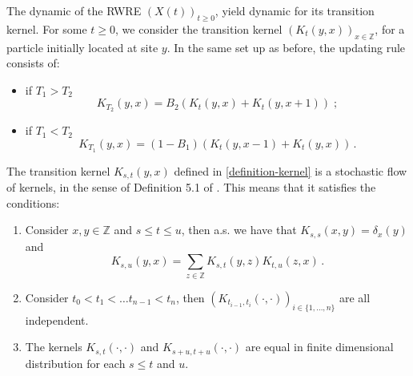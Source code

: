 \documentclass[a4paper,11pt,oneside,reqno]{amsart}
\theoremstyle{definition}
\renewcommand{\leq}{\leqslant}
\renewcommand{\geq}{\geqslant}
\numberwithin{equation}{section}
\begin{document}
The dynamic of the RWRE $(X(t))_{t\geq 0}$, yield dynamic for its transition kernel. For some $t\geq 0$, we consider the transition kernel $(K_{t}(y,x))_{x\in\mathbb{Z}}$, for a particle initially located at site $y$. In the same set up as before, the updating rule consists of:
\begin{itemize}
    \item if $T_{1}>T_{2}$
    \begin{equation}\label{updating-rule-kernel1}
        K_{T_{2}}(y,x)=B_{2}\left(K_{t}(y,x)+K_{t}(y,x+1)\right)\;;
    \end{equation}
    \item if $T_{1}<T_{2}$
    \begin{equation}\label{updating-rule-kernel2}
        K_{T_{1}}(y,x)=(1-B_{1})\left(K_{t}(y,x-1)+K_{t}(y,x)\right)\,.
    \end{equation}
\end{itemize}
The transition kernel $K_{s,t}(y,x)$ defined in \eqref{definition-kernel} is a stochastic flow of kernels, 
in the sense of Definition 5.1 of \cite{brownianWeb}. This means that it satisfies the conditions:
\begin{enumerate}
	\item Consider $x,y\in \mathbb{Z}$ and $s\leq t\leq u$, then a.s. we have that $K_{s,s}(x,y)=\delta_{x}(y)$ and 
	\begin{equation*}
		K_{s,u}(y,x)=\sum_{z\in\mathbb{Z}}K_{s,t}(y,z)K_{t,u}(z,x)\,.
	\end{equation*}
	\item Consider $t_{0}<t_{1}<\ldots t_{n-1}<t_{n}$, then $\left(K_{t_{i-1},t_{i}}(\cdot,\cdot)\right)_{i\in\{1,\ldots,n\}}$ are all independent. 

	\item The kernels $K_{s,t}(\cdot,\cdot)$ and $K_{s+u,t+u}(\cdot,\cdot)$ are equal in finite dimensional distribution for each $s\leq t$ and $u$. 

\end{enumerate}
\end{document}
